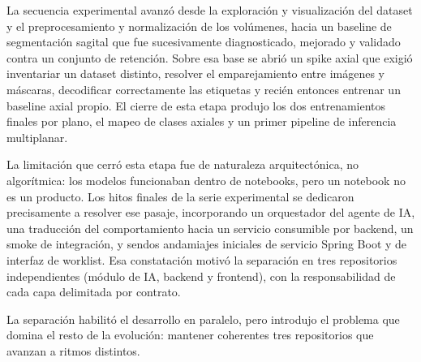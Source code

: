 La secuencia experimental avanzó desde la exploración y visualización del dataset y el preprocesamiento y normalización de los volúmenes, hacia un baseline de segmentación sagital que fue sucesivamente diagnosticado, mejorado y validado contra un conjunto de retención. Sobre esa base se abrió un spike axial que exigió inventariar un dataset distinto, resolver el emparejamiento entre imágenes y máscaras, decodificar correctamente las etiquetas y recién entonces entrenar un baseline axial propio. El cierre de esta etapa produjo los dos entrenamientos finales por plano, el mapeo de clases axiales y un primer pipeline de inferencia multiplanar.

La limitación que cerró esta etapa fue de naturaleza arquitectónica, no algorítmica: los modelos funcionaban dentro de notebooks, pero un notebook no es un producto. Los hitos finales de la serie experimental se dedicaron precisamente a resolver ese pasaje, incorporando un orquestador del agente de IA, una traducción del comportamiento hacia un servicio consumible por backend, un smoke de integración, y sendos andamiajes iniciales de servicio Spring Boot y de interfaz de worklist. Esa constatación motivó la separación en tres repositorios independientes (módulo de IA, backend y frontend), con la responsabilidad de cada capa delimitada por contrato.

La separación habilitó el desarrollo en paralelo, pero introdujo el problema que domina el resto de la evolución: mantener coherentes tres repositorios que avanzan a ritmos distintos.

